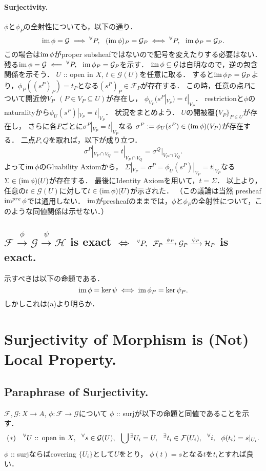 \documentclass[a4paper]{jsarticle}
\newcommand{\shF}{\mathcal{F}}
\newcommand{\shG}{\mathcal{G}}
\newcommand{\shH}{\mathcal{H}}
\begin{document}
    \paragraph{Surjectivity.}
    $\phi$と$\phi_P$の全射性についても，以下の通り．
    \[ \im \phi=\shG \implies \Forall{P} (\im \phi)_P=\shG_P \iff \Forall{P} \im \phi_P=\shG_P. \]
    この場合は$\operatorname{im} \phi$がproper subsheafではないので記号を変えたりする必要はない．
    残る$\im \phi=\shG \impliedby \Forall{P} \im \phi_P=\shG_P$を示す．
    $\im \phi \subseteq \shG$は自明なので，逆の包含関係を示そう．
    $U$ :: open in $X$, $t \in \shG(U)$を任意に取る．
    すると$\im \phi_P=\shG_P$より，$\phi_P((s^P)_P)=t_P$となる$(s^P)_P \in \shF_P$が存在する．
    この時，任意の点$P$について開近傍$V_P ~~(P \in V_P \subseteq U)$が存在し，
    $\phi_{V_P}(s^P|_{V_P})=t|_{V_P}$．
    restrictionと$\phi$のnaturalityから$\phi_U(s^P)|_{V_P}=t|_{V_P}$．
    状況をまとめよう．
    $U$の開被覆$\{V_P\}_{P \in U}$が存在し，
    さらに各$P$ごとに$\sigma^P|_{V_P}=t|_{V_P}$なる
    $\sigma^P:=\phi_U(s^P) \in (\operatorname{im} \phi)(V_P)$が存在する．
    二点$P,Q$を取れば，以下が成り立つ．
    \[ \sigma^P|_{V_P \cap V_Q}=t|_{V_P \cap V_Q}=\sigma^Q|_{V_P \cap V_Q}. \]
    よって$\operatorname{im} \phi$のGluability Axiomから，
    $\Sigma|_{V_P}=\sigma^P=\phi_U(s^P)|_{V_P}=t|_{V_P}$なる$\Sigma \in (\operatorname{im} \phi)(U)$が存在する．
    最後にIdentity Axiomを用いて，$t=\Sigma$．
    以上より，任意の$t \in \shG(U)$に対して$t \in (\operatorname{im} \phi)(U)$が示された．
    （この議論は当然 presheaf $\operatorname{im}^{pre} \phi$では通用しない．
    $\operatorname{im}$がpresheafのままでは，$\phi$と$\phi_P$の全射性について，このような同値関係は示せない．）

    \subsection{$\shF \xrightarrow{\phi} \shG \xrightarrow{\psi} \shH$ is exact $\iff$
    $\Forall{P} \shF_P \xrightarrow{\phi_P} \shG_P \xrightarrow{\psi_P} \shH_P$ is exact.}
    示すべきは以下の命題である．
    \[ \operatorname{im} \phi=\ker \psi \iff \operatorname{im} \phi_P=\ker \psi_P. \]
    しかしこれは(a)より明らか．

    \section{Surjectivity of Morphism is (Not) Local Property.} %
    \subsection{Paraphrase of Surjectivity.}
    $\shF, \shG: X \to A$, $\phi: \shF \to \shG$について
    $\phi$ :: surjが以下の命題と同値であることを示す．
    \[
        (*)~~~
        \Forall{U \text{ :: open in } X}
        \Forall{s \in \shG(U)}
        \bigcup {}^\exists U_i=U,~~
        \Exists{t_i \in \shF(U_i)}
        \Forall{i} \phi(t_i)=s|_{U_i}.
    \]
    $\phi$ :: surjならばcovering $\{U_i\}$として$U$をとり，
    $\phi(t)=s$となる$t$を$t_i$とすれば良い．
\end{document}
